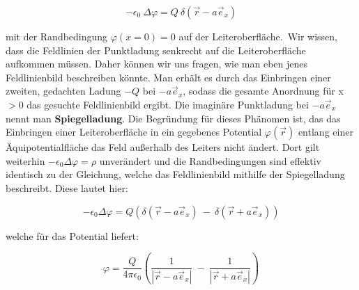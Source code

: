 \begin{equation*}
-\epsilon_0 \ \Delta\varphi = Q \ \delta(\vec{r}-a\vec{e}_x)
\end{equation*}

mit der Randbedingung $\varphi(x=0) = 0$ auf der Leiteroberfläche.\
Wir wissen, dass die Feldlinien der Punktladung senkrecht auf die Leiteroberfläche aufkommen müssen. Daher können wir uns fragen, wie man eben jenes Feldlinienbild beschreiben könnte. Man erhält es durch das Einbringen einer zweiten, gedachten Ladung $-Q$ bei $-a\vec{e}_x$, sodass die gesamte Anordnung für x$>0$ das gesuchte Feldlinienbild ergibt. Die imaginäre Punktladung bei $-a\vec{e}_x$ nennt man \textbf{Spiegelladung}. Die Begründung für dieses Phänomen ist, das das Einbringen einer Leiteroberfläche in ein gegebenes Potential $\varphi (\vec{r})$ entlang einer Äquipotentialfläche das Feld außerhalb des Leiters nicht ändert. Dort gilt weiterhin $-\epsilon_0 \Delta\varphi = \rho$ unverändert und die Randbedingungen sind effektiv identisch zu der Gleichung, welche das Feldlinienbild mithilfe der Spiegelladung beschreibt. Diese lautet hier:

\begin{equation*}
- \epsilon_0\Delta\varphi = Q \left(\delta(\vec{r}-a\vec{e}_x) \ - \ \delta(\vec{r}+a\vec{e}_x)\right)
\end{equation*}

welche für das Potential liefert:

\begin{equation*}
\varphi = \frac{Q}{4\pi\epsilon_0} \left(\frac{1}{|\vec{r}-a\vec{e}_x|} \ - \ \frac{1}{|\vec{r}+a\vec{e}_x|}\right)
\end{equation*}